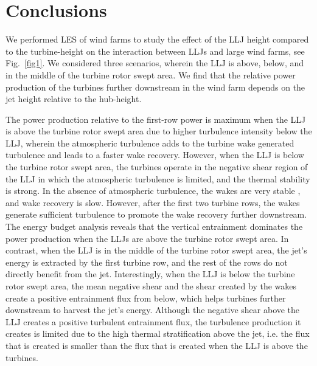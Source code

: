 \documentclass[%
 aip,
 amsmath,amssymb,
reprint,
twocolumn,%
author-numerical,%
]{revtex4-1}
\begin{document}
{{\section{Conclusions}\label{sec4} 
We performed LES of wind farms to study the effect of the LLJ height compared to the turbine-height on the interaction between LLJs and large wind farms, see Fig.\ \ref{fig1}. {\color{black} We considered three scenarios, wherein the LLJ is above, below, and in the middle of the turbine rotor swept area.} We find that the relative power production of the turbines further downstream in the wind farm depends on the jet height relative to the hub-height.} The power production relative to the first-row power is maximum when the LLJ is above the turbine rotor swept area due to higher turbulence intensity below the LLJ, wherein the atmospheric turbulence adds to the turbine wake generated turbulence and leads to a faster wake recovery. {\color{black} However, when the LLJ is below the turbine rotor swept area,} the turbines operate in the negative shear region of the LLJ in which the atmospheric turbulence is limited, and the thermal stability is strong. In the absence of atmospheric turbulence, the wakes are very stable \cite{mao18, kec14}, and wake recovery is slow. However, after the first two turbine rows, the wakes generate sufficient turbulence to promote the wake recovery further downstream. \\
\indent The energy budget analysis reveals that the vertical entrainment dominates the power production when the LLJs are above the turbine rotor swept area. In contrast, when the LLJ is in the middle of the turbine rotor swept area, the jet's energy is extracted by the first turbine row, and the rest of the rows do not directly benefit from the jet. Interestingly, when the LLJ is below the turbine rotor swept area, the mean negative shear and the shear created by the wakes create a positive entrainment flux from below, which helps turbines further downstream to harvest the jet's energy. {\color{black} Although the negative shear above the LLJ creates a positive turbulent entrainment flux, the turbulence production it creates is limited due to the high thermal stratification above the jet, i.e. the flux that is created is smaller than the flux that is created when the LLJ is above the turbines.
}}\\
\end{document}
